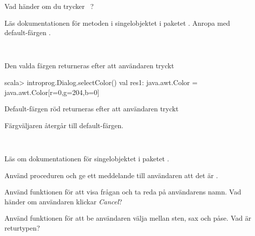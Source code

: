 \Subtask Vad händer om du trycker ~?

\Subtask Läs  dokumentationen för metoden  i singelobjektet  i paketet . Anropa  med default-färgen .

\SOLUTION

\TaskSolved \what~

\Subtask Den valda färgen returneras efter att användaren tryckt 
\begin{REPL}
scala> introprog.Dialog.selectColor()
val res1: java.awt.Color = java.awt.Color[r=0,g=204,b=0]
\end{REPL}


\Subtask Default-färgen röd returneras efter att användaren tryckt 

\Subtask Färgväljaren återgår till default-färgen.

\QUESTEND




\QUESTBEGIN

\Task \what~

\Subtask Läs om dokumentationen för singelobjektet  i paketet .

\Subtask Använd proceduren  och ge ett meddelande till användaren att det är .

\Subtask Använd funktionen  för att visa frågan  och ta reda på användarens namn. Vad händer om användaren klickar \emph{Cancel}?

\Subtask Använd funktionen  för att be användaren välja mellan sten, sax och påse. Vad är returtypen?


